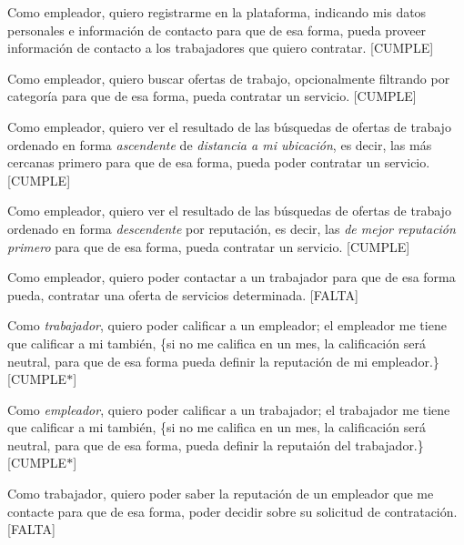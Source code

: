 Como empleador, quiero registrarme en la plataforma, indicando mis datos personales e información de contacto para que de esa forma, pueda proveer información de contacto a los trabajadores que quiero contratar. \mbox{[}CUMPLE\mbox{]}

Como empleador, quiero buscar ofertas de trabajo, opcionalmente filtrando por categoría para que de esa forma, pueda contratar un servicio. \mbox{[}CUMPLE\mbox{]}

Como empleador, quiero ver el resultado de las búsquedas de ofertas de trabajo ordenado en forma {\itshape ascendente} de {\itshape distancia a mi ubicación}, es decir, las más cercanas primero para que de esa forma, pueda poder contratar un servicio. \mbox{[}CUMPLE\mbox{]}

Como empleador, quiero ver el resultado de las búsquedas de ofertas de trabajo ordenado en forma {\itshape descendente} por reputación, es decir, las {\itshape de mejor reputación primero} para que de esa forma, pueda contratar un servicio. \mbox{[}CUMPLE\mbox{]}

Como empleador, quiero poder contactar a un trabajador para que de esa forma pueda, contratar una oferta de servicios determinada. \mbox{[}FALTA\mbox{]}

Como {\itshape trabajador}, quiero poder calificar a un empleador; el empleador me tiene que calificar a mi también, \{si no me califica en un mes, la calificación será neutral, para que de esa forma pueda definir la reputación de mi empleador.\} \mbox{[}CUMPLE$\ast$\mbox{]}

Como {\itshape empleador}, quiero poder calificar a un trabajador; el trabajador me tiene que calificar a mi también, \{si no me califica en un mes, la calificación será neutral, para que de esa forma, pueda definir la reputaión del trabajador.\} \mbox{[}CUMPLE$\ast$\mbox{]}

Como trabajador, quiero poder saber la reputación de un empleador que me contacte para que de esa forma, poder decidir sobre su solicitud de contratación. \mbox{[}FALTA\mbox{]} 